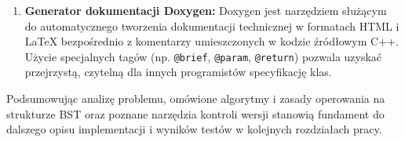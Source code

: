\begin{enumerate}
    \item \textbf{Generator dokumentacji Doxygen:}
    Doxygen jest narzędziem służącym do automatycznego tworzenia dokumentacji technicznej w formatach HTML i \LaTeX{} bezpośrednio z komentarzy umieszczonych w kodzie źródłowym C++. Użycie specjalnych tagów (np. \texttt{@brief}, \texttt{@param}, \texttt{@return}) pozwala uzyskać przejrzystą, czytelną dla innych programistów specyfikację klas.
\end{enumerate}

\hspace{0.60cm}
Podsumowując analizę problemu, omówione algorytmy i zasady operowania na strukturze BST oraz poznane narzędzia kontroli wersji stanowią fundament do dalszego opisu implementacji i wyników testów w kolejnych rozdziałach pracy.